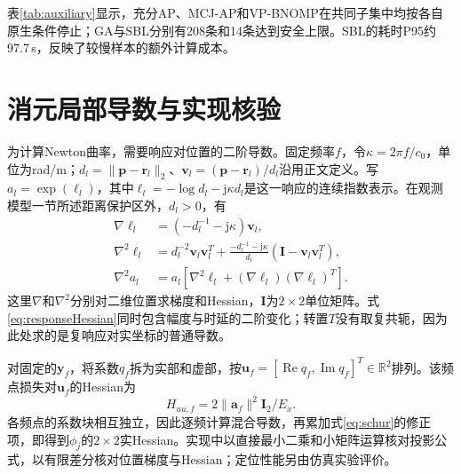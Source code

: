 \documentclass[a4paper,fleqn]{cas-sc}
\numberwithin{equation}{section}
\numberwithin{figure}{section}
\numberwithin{table}{section}
\newcommand{\R}{\mathbb R}
\newcommand{\Rea}{\operatorname{Re}}
\begin{document}

表\ref{tab:auxiliary}显示，充分AP、MCJ-AP和VP-BNOMP在共同子集中均按各自原生条件停止；GA与SBL分别有208条和14条达到安全上限。SBL的耗时P95约97.7\,s，反映了较慢样本的额外计算成本。

\section{消元局部导数与实现核验}\label{app:derivatives}
为计算Newton曲率，需要响应对位置的二阶导数。固定频率$f$，令$\kappa=2\pi f/c_0$，单位为rad/m；$d_l=\|\bm p-\bm r_l\|_2$、$\bm v_l=(\bm p-\bm r_l)/d_l$沿用正文定义。写$a_l=\exp(\ell_l)$，其中$\ell_l=-\log d_l-\mathrm j\kappa d_l$是这一响应的连续指数表示。在观测模型一节所述距离保护区外，$d_l>0$，有
\begin{align}
 \nabla\ell_l&=(-d_l^{-1}-\mathrm j\kappa)\bm v_l,\\
 \nabla^2\ell_l&=d_l^{-2}\bm v_l\bm v_l^T
 +\frac{-d_l^{-1}-\mathrm j\kappa}{d_l}
 (\bm I-\bm v_l\bm v_l^T),\\
 \nabla^2 a_l&=a_l[\nabla^2\ell_l+(\nabla\ell_l)(\nabla\ell_l)^T].\label{eq:responseHessian}
\end{align}
这里$\nabla$和$\nabla^2$分别对二维位置求梯度和Hessian，$\bm I$为$2\times2$单位矩阵。式\eqref{eq:responseHessian}同时包含幅度与时延的二阶变化；转置$T$没有取复共轭，因为此处求的是复响应对实坐标的普通导数。

对固定的$\bm y_f$，将系数$q_f$拆为实部和虚部，按$\bm u_f=[\Rea q_f,\operatorname{Im}q_f]^T\in\R^2$排列。该频点损失对$\bm u_f$的Hessian为
\begin{equation}
 H_{uu,f}=2\|\bm a_f\|^2\bm I_2/E_x .
\end{equation}
各频点的系数块相互独立，因此逐频计算混合导数，再累加式\eqref{eq:schur}的修正项，即得到$\phi_j$的$2\times2$实Hessian。实现中以直接最小二乘和小矩阵运算核对投影公式，以有限差分核对位置梯度与Hessian；定位性能另由仿真实验评价。


\FloatBarrier


\end{document}

